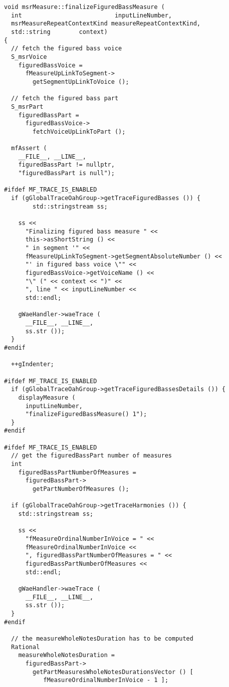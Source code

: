 \begin{lstlisting}[language=CPlusPlus]
void msrMeasure::finalizeFiguredBassMeasure (
  int                          inputLineNumber,
  msrMeasureRepeatContextKind measureRepeatContextKind,
  std::string        context)
{
  // fetch the figured bass voice
  S_msrVoice
    figuredBassVoice =
      fMeasureUpLinkToSegment->
        getSegmentUpLinkToVoice ();

  // fetch the figured bass part
  S_msrPart
    figuredBassPart =
      figuredBassVoice->
        fetchVoiceUpLinkToPart ();

  mfAssert (
    __FILE__, __LINE__,
    figuredBassPart != nullptr,
    "figuredBassPart is null");

#ifdef MF_TRACE_IS_ENABLED
  if (gGlobalTraceOahGroup->getTraceFiguredBasses ()) {
		std::stringstream ss;

    ss <<
      "Finalizing figured bass measure " <<
      this->asShortString () <<
      " in segment '" <<
      fMeasureUpLinkToSegment->getSegmentAbsoluteNumber () <<
      "' in figured bass voice \"" <<
      figuredBassVoice->getVoiceName () <<
      "\" (" << context << ")" <<
      ", line " << inputLineNumber <<
      std::endl;

    gWaeHandler->waeTrace (
      __FILE__, __LINE__,
      ss.str ());
  }
#endif

  ++gIndenter;

#ifdef MF_TRACE_IS_ENABLED
  if (gGlobalTraceOahGroup->getTraceFiguredBassesDetails ()) {
    displayMeasure (
      inputLineNumber,
      "finalizeFiguredBassMeasure() 1");
  }
#endif

#ifdef MF_TRACE_IS_ENABLED
  // get the figuredBassPart number of measures
  int
    figuredBassPartNumberOfMeasures =
      figuredBassPart->
        getPartNumberOfMeasures ();

  if (gGlobalTraceOahGroup->getTraceHarmonies ()) {
    std::stringstream ss;

    ss <<
      "fMeasureOrdinalNumberInVoice = " <<
      fMeasureOrdinalNumberInVoice <<
      ", figuredBassPartNumberOfMeasures = " <<
      figuredBassPartNumberOfMeasures <<
      std::endl;

    gWaeHandler->waeTrace (
      __FILE__, __LINE__,
      ss.str ());
  }
#endif

  // the measureWholeNotesDuration has to be computed
  Rational
    measureWholeNotesDuration =
      figuredBassPart->
        getPartMeasuresWholeNotesDurationsVector () [
           fMeasureOrdinalNumberInVoice - 1 ];


\end{lstlisting}
